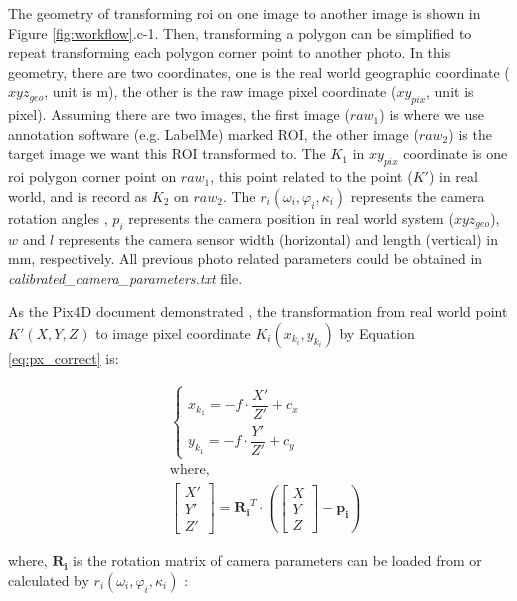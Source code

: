 \documentclass{configs/bmcart}
\begin{document}
The geometry of transforming \acrfull*{roi} on one image to another image is shown in Figure \ref{fig:workflow}.c-1. Then, transforming a polygon can be simplified to repeat transforming each polygon corner point to another photo. In this geometry, there are two coordinates, one is the real world geographic coordinate ($xyz_{geo}$, unit is m), the other is the raw image pixel coordinate ($xy_{pix}$, unit is pixel). Assuming there are two images, the first image ($raw_1$) is where we use annotation software (e.g. LabelMe) marked ROI, the other image ($raw_2$) is the target image we want this ROI transformed to. The $K_1$ in $xy_{pix}$ coordinate is one \acrshort*{roi} polygon corner point on $raw_1$, this point related to the point ($K'$) in real world, and is record as $K_2$ on $raw_2$. The $r_i (\omega_i, \varphi_i, \kappa_i)$ represents the camera rotation angles \cite{pix4d_support_yaw_2020}, $p_i$ represents the camera position in real world system ($xyz_{geo}$), $w$ and $l$ represents the camera sensor width (horizontal) and length (vertical) in mm, respectively. All previous photo related parameters could be obtained in \textit{calibrated\_camera\_parameters.txt} file.

As the Pix4D document demonstrated \cite{pix4d_support_how_2020}, the transformation from real world point $K' (X, Y, Z)$ to image pixel coordinate $K_i (x_{k_i}, y_{k_i})$ by Equation \ref{eq:px_correct} is:

\begin{align}
  \label{eq:xyz_prime}
  &\begin{cases}
    x_{k_1} = - f \cdot \dfrac{X'}{Z'} + c_x \\
    y_{k_1} = - f \cdot \dfrac{Y'}{Z'} + c_y
  \end{cases} \nonumber \\
  &\text{where, } \nonumber \\
  &\left[
    \begin{array}{c} X' \\ Y' \\ Z' \end{array} 
  \right]
  =
  \mathbf{R_i}^T \cdot
  \left(
    \left[\begin{matrix} X \\ Y \\ Z \end{matrix}\right] - \mathbf{p_i}
  \right)
\end{align}

where, $\mathbf{R_i}$ is the rotation matrix of camera parameters can be loaded from  or calculated by $r_i (\omega_i, \varphi_i, \kappa_i)$ \cite{pix4d_support_how_2020}:
\end{document}
